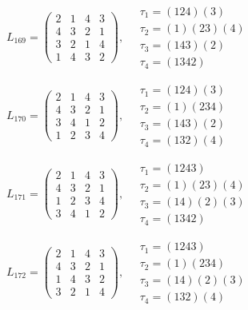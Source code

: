 $L_{169} = \begin{pmatrix} 2 & 1 & 4 & 3 \\ 4 & 3 & 2 & 1 \\ 3 & 2 & 1 & 4 \\ 1 & 4 & 3 & 2 \end{pmatrix}, \quad \begin{matrix} \tau_{1} = (1 2 4)(3) \\ \tau_{2} = (1)(2 3)(4) \\ \tau_{3} = (1 4 3)(2) \\ \tau_{4} = (1 3 4 2) \end{matrix}$

$L_{170} = \begin{pmatrix} 2 & 1 & 4 & 3 \\ 4 & 3 & 2 & 1 \\ 3 & 4 & 1 & 2 \\ 1 & 2 & 3 & 4 \end{pmatrix}, \quad \begin{matrix} \tau_{1} = (1 2 4)(3) \\ \tau_{2} = (1)(2 3 4) \\ \tau_{3} = (1 4 3)(2) \\ \tau_{4} = (1 3 2)(4) \end{matrix}$

$L_{171} = \begin{pmatrix} 2 & 1 & 4 & 3 \\ 4 & 3 & 2 & 1 \\ 1 & 2 & 3 & 4 \\ 3 & 4 & 1 & 2 \end{pmatrix}, \quad \begin{matrix} \tau_{1} = (1 2 4 3) \\ \tau_{2} = (1)(2 3)(4) \\ \tau_{3} = (1 4)(2)(3) \\ \tau_{4} = (1 3 4 2) \end{matrix}$

$L_{172} = \begin{pmatrix} 2 & 1 & 4 & 3 \\ 4 & 3 & 2 & 1 \\ 1 & 4 & 3 & 2 \\ 3 & 2 & 1 & 4 \end{pmatrix}, \quad \begin{matrix} \tau_{1} = (1 2 4 3) \\ \tau_{2} = (1)(2 3 4) \\ \tau_{3} = (1 4)(2)(3) \\ \tau_{4} = (1 3 2)(4) \end{matrix}$

